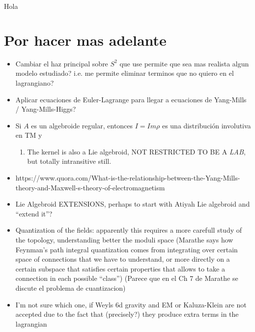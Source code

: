 Hola \cite{Reyes2013}

\section{Por hacer mas adelante}
\begin{itemize}
    \item Cambiar el haz principal sobre $S^2$ que use permite que sea  mas realista algun modelo estudiado? i.e. me permite eliminar terminos que no quiero en el lagrangiano?


    \item Aplicar ecuaciones de Euler-Lagrange para llegar a ecuaciones de Yang-Mills / Yang-Mills-Higgs?
    
    \item Si $A$ es un algebroide regular, entonces $I = Im \rho$ es una distribución involutiva en TM y 
    
    \begin{enumerate}
        \item The kernel is also a Lie algebroid, NOT RESTRICTED TO BE A \emph{LAB}, but totally intransitive still.
    \end{enumerate}
    
    \item https://www.quora.com/What-is-the-relationship-between-the-Yang-Mills-theory-and-Maxwell-s-theory-of-electromagnetism
    
    \item Lie Algebroid EXTENSIONS, perhaps to start with Atiyah Lie algebroid and ``extend it''?
    
    \item Quantization of the fields: apparently this requires a more carefull study of the topology, understanding better the moduli space (Marathe says how Feynman's path integral quantization comes from integrating over certain space of connections that we have to understand, or more directly on a certain subspace that satisfies certain properties that allows to take a connection in each possible ``class'') (Parece que en el Ch 7 de Marathe se discute el problema de cuantizacion)
    
    \item I'm not sure which one, if Weyls 6d gravity and EM or Kaluza-Klein are not accepted due to the fact that (precisely?) they produce extra terms in the lagrangian
\end{itemize}